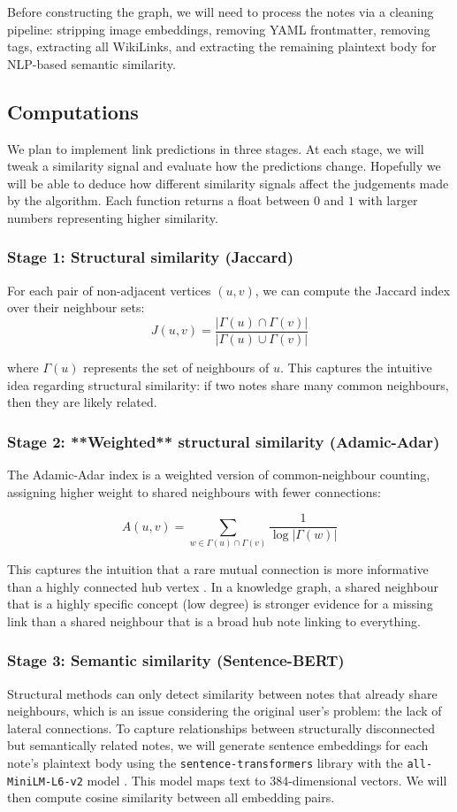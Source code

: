 \documentclass[fontsize=11pt]{article}
\begin{document}
\noindent Before constructing the graph, we will need to process the notes via a cleaning pipeline: stripping image embeddings, removing YAML frontmatter, removing tags, extracting all WikiLinks, and extracting the remaining plaintext body for NLP-based semantic similarity.

\subsection*{Computations}
We plan to implement link predictions in three stages. At each stage, we will tweak a similarity signal and evaluate how the predictions change. Hopefully we will be able to deduce how different similarity signals affect the judgements made by the algorithm. Each function returns a float between $0$ and $1$ with larger numbers representing higher similarity.

\subsubsection*{Stage 1: Structural similarity (Jaccard)}
For each pair of non-adjacent vertices $(u,v)$, we can compute the Jaccard index over their neighbour sets:
$$
J(u,v) = \frac{|\Gamma(u) \cap \Gamma(v)|}{|\Gamma(u) \cup \Gamma(v)|}
$$

where $\Gamma(u)$ represents the set of neighbours of $u$. This captures the intuitive idea regarding structural similarity: if two notes share many common neighbours, then they are likely related.

\subsubsection*{Stage 2: **Weighted** structural similarity (Adamic-Adar)}
The Adamic-Adar index is a weighted version of common-neighbour counting, assigning higher weight to shared neighbours with fewer connections: 

$$
A(u, v) = \sum_{w \in \Gamma(u) \cap \Gamma(v)} \frac{1}{\log |\Gamma(w)|}
$$

\noindent This captures the intuition that a rare mutual connection is more informative than a highly connected hub vertex \cite{adamic2003}. In a knowledge graph, a shared neighbour that is a highly specific concept (low degree) is stronger evidence for a missing link than a shared neighbour that is a broad hub note linking to everything.
 

\subsubsection*{Stage 3: Semantic similarity (Sentence-BERT)}
Structural methods can only detect similarity between notes that already share neighbours, which is an issue considering the original user's problem: the lack of lateral connections. To capture relationships between structurally disconnected but semantically related notes, we will generate sentence embeddings for each note's plaintext body using the \texttt{sentence-transformers} library with the \texttt{all-MiniLM-L6-v2} model \cite{reimers2019}. This model maps text to 384-dimensional vectors. We will then compute cosine similarity between all embedding pairs. \\
\end{document}
